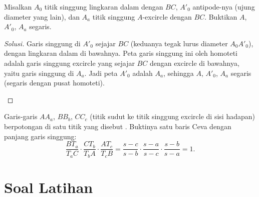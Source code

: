 \documentclass[12pt]{scrartcl}
\begin{document}
\begin{example}
Misalkan $A_0$ titik singgung lingkaran dalam dengan $BC$,
$A'_0$ antipode-nya (ujung diameter yang lain),
dan $A_a$ titik singgung $A$-excircle dengan $BC$.
Buktikan $A$, $A'_0$, $A_a$ segaris.
\end{example}
\begin{proof}[Solusi]
Garis singgung di $A'_0$ sejajar $BC$ (keduanya tegak lurus diameter
$A_0A'_0$), dengan lingkaran dalam di bawahnya.
Peta garis singgung ini oleh homoteti adalah garis singgung excircle
yang sejajar $BC$ dengan excircle di bawahnya, yaitu garis singgung
di $A_a$. Jadi peta $A'_0$ adalah $A_a$,
sehingga $A$, $A'_0$, $A_a$ segaris (segaris dengan pusat homoteti).
\begin{center}
\end{center}
\end{proof}

\begin{remark}
Garis-garis $AA_a$, $BB_b$, $CC_c$ (titik sudut ke titik singgung
excircle di sisi hadapan) berpotongan di satu titik yang disebut
.
Buktinya satu baris Ceva dengan panjang garis singgung:
\[ \frac{BT_a}{T_aC} \cdot \frac{CT_b}{T_bA} \cdot \frac{AT_c}{T_cB}
= \frac{s-c}{s-b} \cdot \frac{s-a}{s-c} \cdot \frac{s-b}{s-a} = 1. \]
\end{remark}

\section{Soal Latihan}
\end{document}
